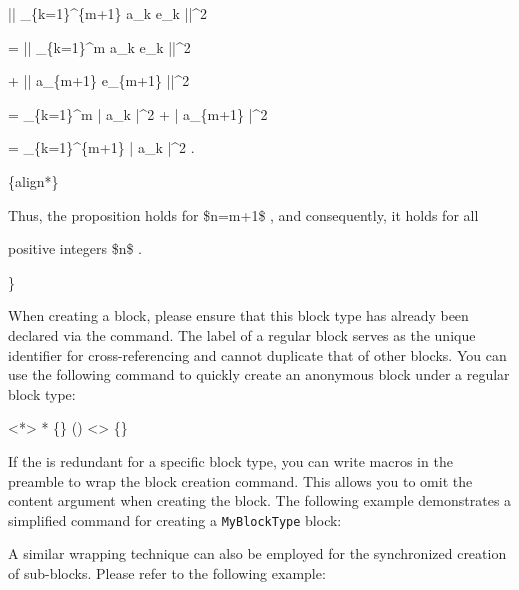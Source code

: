 {    \par\indent\indent {}|| \_\{k=1\}\^{}\{m+1\} a\_k  e\_k ||\^{}2
    \par\indent\indent = || \_\{k=1\}\^{}m a\_k  e\_k ||\^{}2
    \par\indent\indent + || a\_\{m+1\}  e\_\{m+1\} ||\^{}2
    \par\indent\indent = \_\{k=1\}\^{}m | a\_k |\^{}2 + | a\_\{m+1\} |\^{}2
    \par\indent\indent = \_\{k=1\}\^{}\{m+1\} | a\_k |\^{}2 \cs{ }.
    \par {}\{align*\}
    \par Thus, the proposition holds for \$n=m+1\$ , and consequently, it holds for all
    \par positive integers \$n\$ .
    \par\noindent \}
}

\AutomaticListon

When creating a block, please ensure that this block type has already been declared via the  command. The label of a regular block serves as the unique identifier for cross-referencing and cannot duplicate that of other blocks. You can use the following command to quickly create an anonymous block under a regular block type:

<*>{
    *
    \{\}
    ()
    <>
    \{\longarg\}
}

If the  is redundant for a specific block type, you can write macros in the preamble to wrap the block creation command. This allows you to omit the content argument when creating the block. The following example demonstrates a simplified command for creating a \texttt{MyBlockType} block:


A similar wrapping technique can also be employed for the synchronized creation of sub-blocks. Please refer to the following example:


